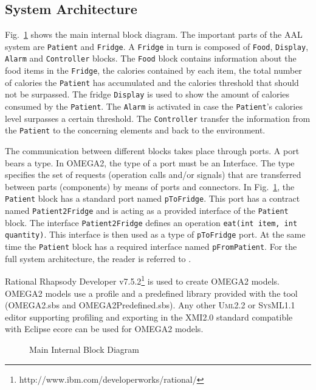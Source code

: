 \documentclass[a4paper,twoside]{article}
\def\sysml{\textsc{SysML}}
\def\uml{\textsc{Uml}}
\begin{document}
\subsection{System Architecture}
Fig.~\ref{fig:mainibd} shows the main internal block diagram. The important parts of the AAL system are \texttt{Patient} and \texttt{Fridge}. A \texttt{Fridge} in turn is composed of \texttt{Food}, \texttt{Display}, \texttt{Alarm} and \texttt{Controller} blocks. The \texttt{Food} block contains information about the food items in the \texttt{Fridge}, the calories contained by each item, the total number of calories the \texttt{Patient} has accumulated and the calories threshold that should not be surpassed. The fridge \texttt{Display} is used to show the amount of calories consumed by the \texttt{Patient}. The \texttt{Alarm} is activated in case the \texttt{Patient}'s calories level surpasses a certain threshold. The \texttt{Controller} transfer the information from the \texttt{Patient} to the concerning elements and back to the environment. 

The communication between different blocks takes place through ports. A  port  bears  a  type.  In  OMEGA2,  the  type  of  a  port  must  be  an  Interface. The type specifies the set of requests (operation calls and/or signals) that  are transferred between parts (components) by means of ports and connectors. In Fig.~\ref{fig:mainibd}, the \texttt{Patient} block has a standard port named \texttt{pToFridge}. This port has a contract named \texttt{Patient2Fridge} and is acting as a provided interface of the \texttt{Patient} block. The interface \texttt{Patient2Fridge} defines an operation \texttt{eat(int item, int quantity)}. This interface is then used as a type of \texttt{pToFridge} port. At the same time the \texttt{Patient} block has a required interface named \texttt{pFromPatient}. For the full system architecture, the reader is referred to \cite{test17}.

Rational Rhapsody Developer v7.5.2\footnote{http://www.ibm.com/developerworks/rational/} is used to create OMEGA2 models. OMEGA2 models use a profile and a predefined library provided with the tool (OMEGA2.sbs and OMEGA2Predefined.sbs). Any other \uml{}2.2 or \sysml{}1.1 editor supporting profiling and exporting in the XMI2.0 standard compatible with Eclipse ecore can be used for OMEGA2 models.

\begin{figure}[!h]
  \centering
  {}
  \caption{Main Internal Block Diagram}
  \label{fig:mainibd}
 \end{figure}
 
\end{document}
